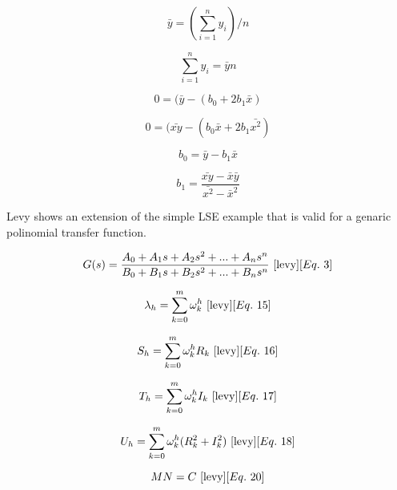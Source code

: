 \begin{equation}
\bar{y} = (\sum_{i=1}^{n} y_i) / n
\end{equation}

\begin{equation}
\sum_{i=1}^{n} y_i  = \bar{y}n
\end{equation}

\begin{equation}
0 = (\bar{y} - (b_0 + 2b_1 \bar{x})
\end{equation}

\begin{equation}
0 = (\bar{xy} - (b_0 \bar{x} + 2b_1 \bar{x^2})
\end{equation}

\begin{equation}
b_0 = \bar{y} - b_1 \bar{x}
\end{equation}

\begin{equation}
b_1 = \frac{\bar{xy} - \bar{x}\bar{y}}{\bar{x^2} - \bar{x}^2}
\end{equation}


Levy shows an extension of the simple LSE example that is valid for a genaric polinomial transfer function.

\begin{equation}
G(s) = \frac{A_0 + A_1 s + A_2 s^2 + ... + A_n s^n}{B_0 + B_1 s + B_2 s^2 + ... + B_n s^n}
~\cite{levy}[Eq.~3]
\end{equation}

\begin{equation}
\lambda _h = \sum_{k=0}^{m} \omega _k ^h
~\cite{levy}[Eq.~15]
\end{equation}

\begin{equation}
S_h = \sum_{k=0}^{m} \omega _k ^h R_k
~\cite{levy}[Eq.~16]
\end{equation}

\begin{equation}
T_h = \sum_{k=0}^{m} \omega _k ^h I_k
~\cite{levy}[Eq.~17]
\end{equation}

\begin{equation}
U_h = \sum_{k=0}^{m} \omega _k ^h (R_k ^2 + I_k ^2)
~\cite{levy}[Eq.~18]
\end{equation}

\begin{equation}
MN = C
~\cite{levy}[Eq.~20]
\end{equation}

